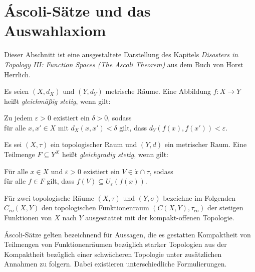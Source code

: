 \section{Áscoli-Sätze und das Auswahlaxiom}

Dieser Abschnitt ist eine ausgestaltete Darstellung des Kapitels \textit{Disasters in Topology III: Function Spaces (The Ascoli Theorem)} aus dem Buch von Horst Herrlich.

\begin{defn}
  Es seien $(X,d_X)$ und $(Y,d_Y)$ metrische Räume. Eine Abbildung $f \colon X \to Y$ heißt \textit{gleichmäßig stetig}, wenn gilt:
  \begin{addmargin}[2em]{2em}%
  Zu jedem $\varepsilon > 0$ existiert ein $\delta > 0$, sodass \\
  für alle $x,x' \in X$ mit $d_X(x,x') < \delta$ gilt, dass $d_Y(f(x),f(x')) < \varepsilon$.
  \end{addmargin}
\end{defn}

\begin{defn}
  Es sei $(X,\tau)$ ein topologischer Raum und $(Y,d)$ ein metrischer Raum. Eine Teilmenge $F \subseteq Y^X$ heißt \textit{gleichgradig stetig}, wenn gilt:
  \begin{addmargin}[2em]{2em}%
    Für alle $x \in X$ und $\varepsilon > 0$ existiert ein $V \in \dot{x} \cap \tau$, sodass \\
    für alle $f \in F$ gilt, dass $f(V) \subseteq U_\varepsilon(f(x))$.
  \end{addmargin}
\end{defn}

Für zwei topologische Räume $(X,\tau)$ und $(Y,\sigma)$ bezeichne im Folgenden $C_{co}(X,Y)$ den topologischen Funktionenraum $(C(X,Y),\tau_{co})$ der stetigen Funktionen von $X$ nach $Y$ ausgestattet mit der kompakt-offenen Topologie.

Áscoli-Sätze gelten bezeichnend für Aussagen, die es gestatten Kompaktheit von Teilmengen von Funktionenräumen bezüglich starker Topologien aus der Kompaktheit bezüglich einer schwächeren Topologie unter zusätzlichen Annahmen zu folgern. Dabei existieren unterschiedliche Formulierungen.

